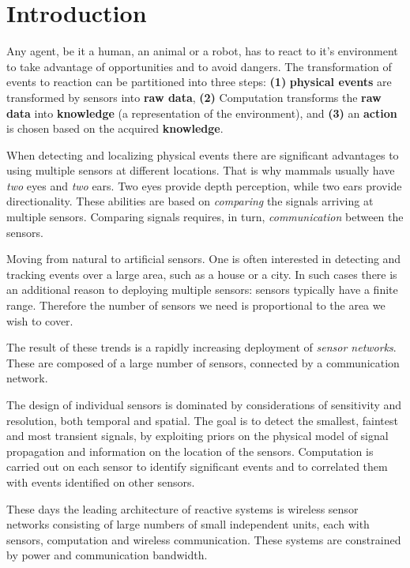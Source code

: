 \section{Introduction}
Any agent, be it a human, an animal or a robot, has to react to it's
environment to take advantage of opportunities and to avoid
dangers. The transformation of events to reaction can be partitioned
into three steps: {\bf(1)} {\bf physical events} are transformed by
sensors into {\bf raw data}, {\bf (2)} Computation transforms the {\bf
  raw data} into {\bf knowledge} (a representation of the
environment), and {\bf (3)} an {\bf action} is chosen based on the
acquired {\bf knowledge}.


When detecting and localizing physical events there are significant
advantages to using multiple sensors at different
locations. That is why mammals usually have {\em two} eyes and {\em two}
ears. Two eyes provide depth perception, while two ears
provide directionality. These
abilities are based on {\em comparing} the signals arriving at multiple sensors. 
Comparing signals requires, in turn, {\em
  communication} between the sensors.

Moving from natural to artificial sensors. One is often interested in
detecting and tracking events over a large area, such as a house or a
city. In such cases there is an additional reason to deploying
multiple sensors: sensors typically have a finite range. Therefore the
number of sensors we need is proportional to the area we wish to
cover.

The result of these trends is a rapidly increasing deployment of
{\em  sensor networks}. These are composed
of a large number of sensors, connected by a communication network.

The design of individual sensors is dominated by considerations of
sensitivity and resolution, both temporal and spatial.  The goal is to
detect the smallest, faintest and most transient signals, by
exploiting priors on the physical model of signal propagation and
information on the location of the sensors. Computation is carried out
on each sensor to identify significant events and to correlated them
with events identified on other sensors.

These days the leading architecture of reactive systems is wireless
sensor networks consisting of large numbers of small
independent units, each with sensors, computation and wireless
communication. These systems are constrained by power and communication
bandwidth.


